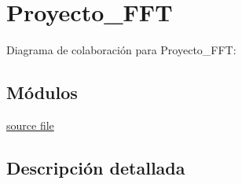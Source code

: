 \hypertarget{group___proyecto___f_f_t}{}\section{Proyecto\+\_\+\+F\+FT}
\label{group___proyecto___f_f_t}
Diagrama de colaboración para Proyecto\+\_\+\+F\+FT\+:
\subsection*{Módulos}
\begin{DoxyCompactItemize}
\item 
\hyperlink{group___main}{source file}
\end{DoxyCompactItemize}


\subsection{Descripción detallada}
